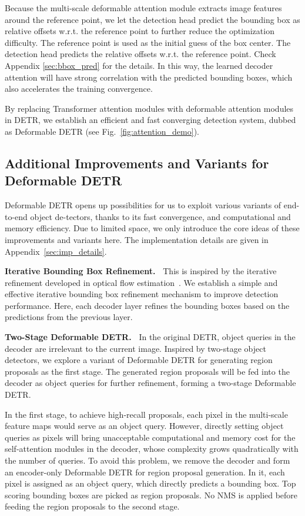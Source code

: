 Because the multi-scale deformable attention module extracts image features around the reference point, we let the detection head predict the bounding box as relative offsets w.r.t. the reference point to further reduce the optimization difficulty. The reference point is used as the initial guess of the box center. The detection head predicts the relative offsets w.r.t. the reference point. Check Appendix \ref{sec:bbox_pred} for the details. In this way, the learned decoder attention will have strong correlation with the predicted bounding boxes, which also accelerates the training convergence.

By replacing Transformer attention modules with deformable attention modules in DETR, we establish an efficient and fast converging detection system, dubbed as Deformable DETR (see Fig.~\ref{fig:attention_demo}).

\subsection{Additional Improvements and Variants for Deformable DETR}
\label{sec:improve}

Deformable DETR opens up possibilities for us to exploit various variants of end-to-end object de-tectors, thanks to its fast convergence, and computational and memory efficiency. Due to limited space, we only introduce the core ideas of these improvements and variants here. The implementation details are given in Appendix~\ref{sec:imp_details}.

\textbf{Iterative Bounding Box Refinement.~}
This is inspired by the iterative refinement developed in optical flow estimation~\citep{teed2020raft}.
We establish a simple and effective iterative bounding box refinement mechanism to improve detection performance. Here, each decoder layer refines the bounding boxes based on the predictions from the previous layer.


\textbf{Two-Stage Deformable DETR.~}
In the original DETR, object queries in the decoder are irrelevant to the current image. Inspired by two-stage object detectors, we explore a variant of Deformable DETR for generating region proposals as the first stage. The generated region proposals will be fed into the decoder as object queries for further refinement, forming a two-stage Deformable DETR.

In the first stage, to achieve high-recall proposals, each pixel in the multi-scale feature maps would serve as an object query. However, directly setting object queries as pixels will bring unacceptable computational and memory cost for the self-attention modules in the decoder, whose complexity grows quadratically with the number of queries. To avoid this problem, we remove the decoder and form an encoder-only Deformable DETR for region proposal generation. In it, each pixel is assigned as an object query, which directly predicts a bounding box. Top scoring bounding boxes are picked as region proposals.
No NMS is applied before feeding the region proposals to the second stage.


